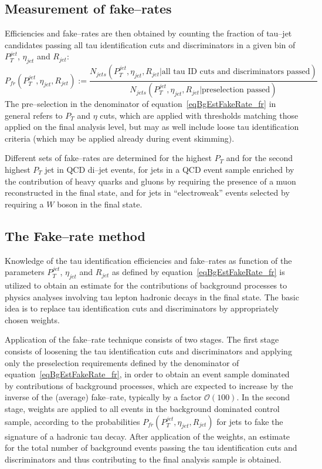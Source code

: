 \subsection{Measurement of fake--rates}

Efficiencies and fake--rates are then obtained by counting the fraction of tau--jet candidates
passing all tau identification cuts and discriminators
in a given bin of $P_{T}^{jet}$, $\eta_{jet}$ and $R_{jet}$:
\begin{equation}
P_{fr} \left( P_{T}^{jet}, \eta_{jet}, R_{jet} \right) := 
  \frac{N_{jets} \left( P_{T}^{jet}, \eta_{jet}, R_{jet} \vert \mbox{all tau ID cuts and discriminators passed} \right)}
       {N_{jets} \left( P_{T}^{jet}, \eta_{jet}, R_{jet} \vert \mbox{preselection passed} \right)}
\label{eqBgEstFakeRate_fr}
\end{equation}
The pre--selection in the denominator of equation~\ref{eqBgEstFakeRate_fr} in
general refers to $P_{T}$ and $\eta$ cuts, which are applied with thresholds
matching those applied on the final analysis level, but may as well include
loose tau identification criteria (which may be applied \eg already during event
skimming).

Different sets of fake--rates are determined for the highest $P_{T}$ and for the
second highest $P_{T}$ jet in QCD di--jet events, for jets in a QCD event sample
enriched by the contribution of heavy quarks and gluons by requiring the
presence of a muon reconstructed in the final state, and for jets in
``electroweak'' events selected by requiring a $W$ boson in the final state.

\subsection{The Fake--rate method}

Knowledge of the tau identification efficiencies and fake--rates as function of
the parameters $P_{T}^{jet}$, $\eta_{jet}$ and $R_{jet}$ as defined by
equation~\ref{eqBgEstFakeRate_fr} is utilized to obtain an estimate for the
contributions of background processes to physics analyses involving tau lepton
hadronic decays in the final state.  The basic idea is to replace tau
identification cuts and discriminators by appropriately chosen weights.

Application of the fake--rate technique consists of two stages.  The first stage
consists of loosening the tau identification cuts and discriminators and
applying only the preselection requirements defined by the denominator of
equation~\ref{eqBgEstFakeRate_fr}, in order to obtain an event sample dominated
by contributions of background processes, which are expected to increase by the
inverse of the (average) fake--rate, typically by a factor $\mathcal{O} \left(
100 \right)$.  In the second stage, weights are applied to all events in the
background dominated control sample, according to the probabilities $P_{fr}
\left( P_{T}^{jet}, \eta_{jet}, R_{jet} \right)$ for jets to fake the signature
of a hadronic tau decay.  After application of the weights, an estimate for the
total number of background events passing the tau identification cuts and
discriminators and thus contributing to the final analysis sample is obtained.

